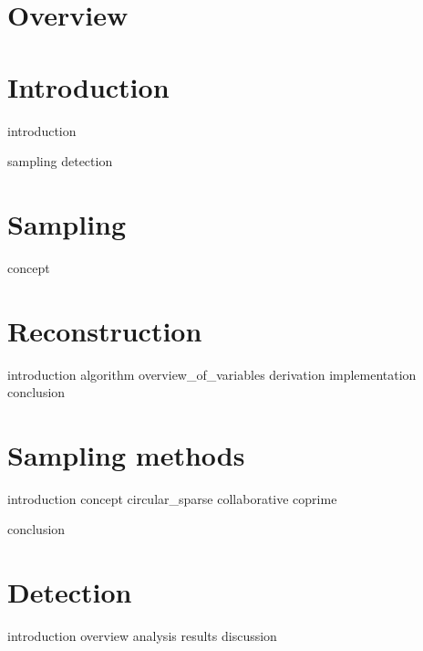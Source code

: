 \documentclass[a4paper, openany, oneside]{memoir}
\begin{document}
\chapter{Overview}

\chapter{Introduction}
{introduction}

{sampling}
{detection}


\chapter{Sampling}
\label{cha:sampling}

{concept}

\chapter{Reconstruction}
\label{cha:reconstruction}

{introduction}
{algorithm}
{overview_of_variables}
{derivation}
{implementation}
{conclusion}

\chapter{Sampling methods}
\label{cha:sampling_methods}

{introduction}
{concept}
{circular_sparse} 
{collaborative}
{coprime}

{conclusion}


\chapter{Detection}

{introduction}
{overview}
{analysis}
{results}
{discussion}
\end{document}
